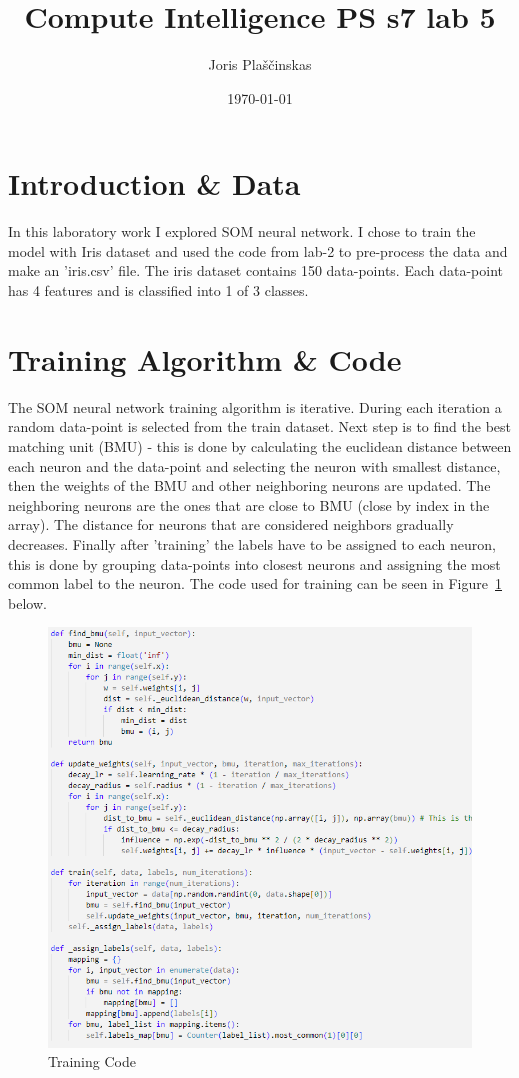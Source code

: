 \documentclass{article}
\title{Compute Intelligence PS s7 lab 5}
\author{Joris Plaščinskas}
\date{\today}
\begin{document}
\maketitle
\section*{Introduction \& Data}
In this laboratory work I explored SOM neural network. I chose to train the model with Iris dataset and used the code from lab-2 to pre-process the data and make an 'iris.csv' file. The iris dataset contains 150 data-points. Each data-point has 4 features and is classified into 1 of 3 classes.

\section*{Training Algorithm \& Code}
The SOM neural network training algorithm is iterative. During each iteration a random data-point is selected from the train dataset. Next step is to find the best matching unit (BMU) - this is done by calculating the euclidean distance between each neuron and the data-point and selecting the neuron with smallest distance, then the weights of the BMU and other neighboring neurons are updated. The neighboring neurons are the ones that are close to BMU (close by index in the array). The distance for neurons that are considered neighbors gradually decreases. Finally after 'training' the labels have to be assigned to each neuron, this is done by grouping data-points into closest neurons and assigning the most common label to the neuron. The code used for training can be seen in Figure~\ref{fig:train} below.
\begin{figure}[H]
    \centering
    \includegraphics[width=1\textwidth]{SOM-train.png}
    \caption{Training Code}
    \label{fig:train}
\end{figure}
\end{document}
